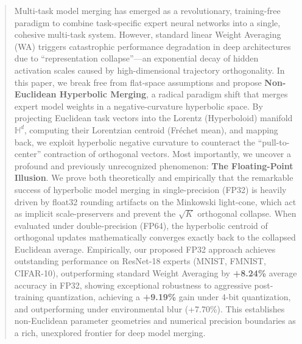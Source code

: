 \documentclass{article}
\theoremstyle{plain}
\theoremstyle{definition}
\theoremstyle{remark}
\begin{document}

\printAffiliationsAndNotice{\icmlEqualContribution}

\begin{abstract}
Multi-task model merging has emerged as a revolutionary, training-free paradigm to combine task-specific expert neural networks into a single, cohesive multi-task system. However, standard linear Weight Averaging (WA) triggers catastrophic performance degradation in deep architectures due to ``representation collapse''---an exponential decay of hidden activation scales caused by high-dimensional trajectory orthogonality. In this paper, we break free from flat-space assumptions and propose \textbf{Non-Euclidean Hyperbolic Merging}, a radical paradigm shift that merges expert model weights in a negative-curvature hyperbolic space. By projecting Euclidean task vectors into the Lorentz (Hyperboloid) manifold $\mathbb{H}^d$, computing their Lorentzian centroid (Fréchet mean), and mapping back, we exploit hyperbolic negative curvature to counteract the ``pull-to-center'' contraction of orthogonal vectors. Most importantly, we uncover a profound and previously unrecognized phenomenon: \textbf{The Floating-Point Illusion}. We prove both theoretically and empirically that the remarkable success of hyperbolic model merging in single-precision (FP32) is heavily driven by float32 rounding artifacts on the Minkowski light-cone, which act as implicit scale-preservers and prevent the $\sqrt{K}$ orthogonal collapse. When evaluated under double-precision (FP64), the hyperbolic centroid of orthogonal updates mathematically converges exactly back to the collapsed Euclidean average. Empirically, our proposed FP32 approach achieves outstanding performance on ResNet-18 experts (MNIST, FMNIST, CIFAR-10), outperforming standard Weight Averaging by \textbf{+8.24\%} average accuracy in FP32, showing exceptional robustness to aggressive post-training quantization, achieving a \textbf{+9.19\%} gain under 4-bit quantization, and outperforming under environmental blur (+7.70\%). This establishes non-Euclidean parameter geometries and numerical precision boundaries as a rich, unexplored frontier for deep model merging.
\end{abstract}
\end{document}
